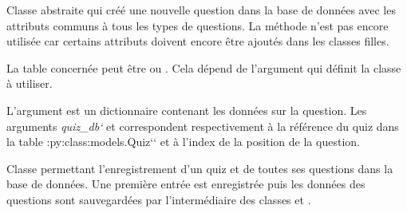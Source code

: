 \documentclass[a4paper,11pt,openany,oneside]{sphinxmanual}
\begin{document}
\begin{fulllineitems}
\label{source:quiz.utils.save.SaveQuestion}
Classe abstraite qui créé une nouvelle question dans la base de données avec
les attributs communs à tous les types de questions. La méthode 
n'est pas encore utilisée car certains attributs doivent encore être ajoutés
dans les classes filles.

La table concernée peut être  ou .
Cela dépend de l'argument  qui définit la classe à utiliser.

L'argument  est un dictionnaire contenant les données sur la question.
Les arguments \emph{quiz\_db{}`} et  correspondent respectivement à la référence
du quiz dans la table :py:class:models.Quiz{}`{}` et à l'index de la position
de la question.

\end{fulllineitems}


\begin{fulllineitems}
\label{source:quiz.utils.save.SaveQuiz}
Classe permettant l'enregistrement d'un quiz et de toutes ses questions dans
la base de données. Une première entrée  est enregistrée
puis les données des questions sont sauvegardées par l'intermédiaire des classes
{\hyperref[source:quiz.utils.save.SaveSimpleQuestion]{\emph{}}} et {\hyperref[source:quiz.utils.save.SaveQcm]{\emph{}}}.

\end{fulllineitems}

\end{document}
